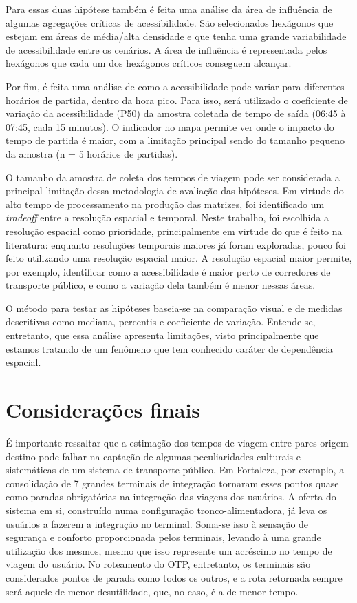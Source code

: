 \documentclass[        
    a4paper,          %
    12pt,             %
    chapter=TITLE,    %
    section=Title,    %
    subsection=Title, %
    oneside,          %
    english,          %
    spanish,          %
    brazil,           %
    fleqn             %
]{abntex2}
\begin{document}
  Para essas duas hipótese também é feita uma análise da área de influência de algumas agregações críticas de acessibilidade. São selecionados hexágonos que estejam em áreas de média/alta densidade e que tenha uma grande variabilidade de acessibilidade entre os cenários. A área de influência é representada pelos hexágonos que cada um dos hexágonos críticos conseguem alcançar.
  
  Por fim, é feita uma análise de como a acessibilidade pode variar para diferentes horários de partida, dentro da hora pico. Para isso, será utilizado o coeficiente de variação da acessibilidade (P50) da amostra coletada de tempo de saída (06:45 à 07:45, cada 15 minutos). O indicador no mapa permite ver onde o impacto do tempo de partida é maior, com a limitação principal sendo do tamanho pequeno da amostra (n = 5 horários de partidas).
  
  O tamanho da amostra de coleta dos tempos de viagem pode ser considerada a principal limitação dessa metodologia de avaliação das hipóteses. Em virtude do alto tempo de processamento na produção das matrizes, foi identificado um \emph{tradeoff} entre a resolução espacial e temporal. Neste trabalho, foi escolhida a resolução espacial como prioridade, principalmente em virtude do que é feito na literatura: enquanto resoluções temporais maiores já foram exploradas, pouco foi feito utilizando uma resolução espacial maior. A resolução espacial maior permite, por exemplo, identificar como a acessibilidade é maior perto de corredores de transporte público, e como a variação dela também é menor nessas áreas.
  
  O método para testar as hipóteses baseia-se na comparação visual e de medidas descritivas como mediana, percentis e coeficiente de variação. Entende-se, entretanto, que essa análise apresenta limitações, visto principalmente que estamos tratando de um fenômeno que tem conhecido caráter de dependência espacial.
  
  \hypertarget{consideracoes-finais-2}{%
  \section{Considerações finais}\label{consideracoes-finais-2}}
  
  É importante ressaltar que a estimação dos tempos de viagem entre pares origem destino pode falhar na captação de algumas peculiaridades culturais e sistemáticas de um sistema de transporte público. Em Fortaleza, por exemplo, a consolidação de 7 grandes terminais de integração tornaram esses pontos quase como paradas obrigatórias na integração das viagens dos usuários. A oferta do sistema em si, construído numa configuração tronco-alimentadora, já leva os usuários a fazerem a integração no terminal. Soma-se isso à sensação de segurança e conforto proporcionada pelos terminais, levando à uma grande utilização dos mesmos, mesmo que isso represente um acréscimo no tempo de viagem do usuário. No roteamento do OTP, entretanto, os terminais são considerados pontos de parada como todos os outros, e a rota retornada sempre será aquele de menor desutilidade, que, no caso, é a de menor tempo.
  
\end{document}
